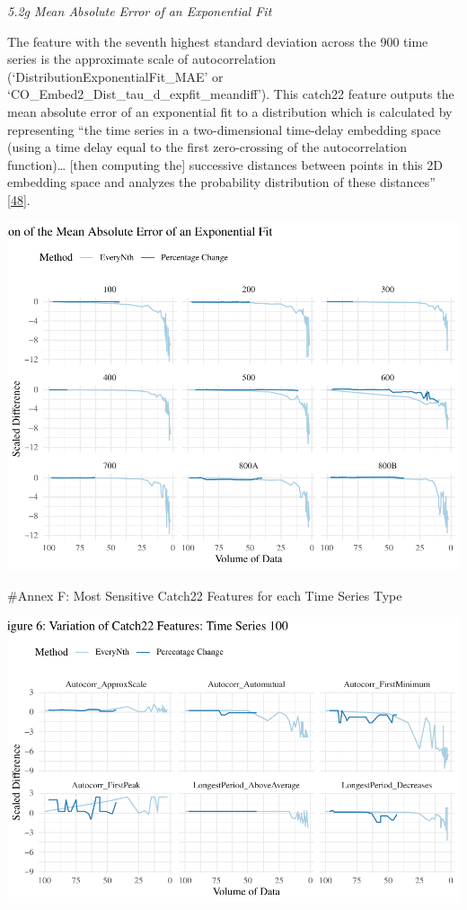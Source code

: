 \documentclass{article}
\begin{document}
\emph{5.2g Mean Absolute Error of an Exponential Fit}

The feature with the seventh highest standard deviation across the 900
time series is the approximate scale of autocorrelation
(`DistributionExponentialFit\_MAE' or
`CO\_Embed2\_Dist\_tau\_d\_expfit\_meandiff'). This catch22 feature
outputs the mean absolute error of an exponential fit to a distribution
which is calculated by representing ``the time series in a
two-dimensional time-delay embedding space (using a time delay equal to
the first zero-crossing of the autocorrelation function)\ldots{} {[}then
computing the{]} successive distances between points in this 2D
embedding space and analyzes the probability distribution of these
distances'' \protect\hyperlink{ref-feature_book}{{[}48{]}}.

\includegraphics{210431461_CSC8639_Dissertation_files/figure-latex/MAE-1.pdf}

\newpage

\#Annex F: Most Sensitive Catch22 Features for each Time Series Type

\includegraphics{210431461_CSC8639_Dissertation_files/figure-latex/Catch22Variation100-1.pdf}
\end{document}
